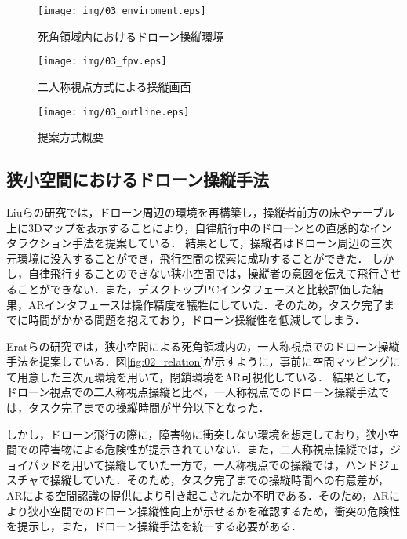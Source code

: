 \documentclass[submit]{ipsj}
\begin{document}
\begin{figure}[tb]
  \centering
  \texttt{[image: img/03\_enviroment.eps]}
  \caption{死角領域内におけるドローン操縦環境}
  \label{fig:03_enviroment}
  \end{figure}
  
  \begin{figure}[tb]
    \centering
    \texttt{[image: img/03\_fpv.eps]}
    \caption{二人称視点方式による操縦画面}
    \label{fig:03_FPV}
  \end{figure}
  
  \begin{figure}[tb]
  \centering
  \texttt{[image: img/03\_outline.eps]}
  \caption{提案方式概要}
  \label{fig:03_outline}
  \end{figure}

\subsection{狭小空間におけるドローン操縦手法}

Liuらの研究\cite{book-ar04}では，ドローン周辺の環境を再構築し，操縦者前方の床やテーブル上に3Dマップを表示することにより，自律航行中のドローンとの直感的なインタラクション手法を提案している．
結果として，操縦者はドローン周辺の三次元環境に没入することができ，飛行空間の探索に成功することができた．
しかし，自律飛行することのできない狭小空間では，操縦者の意図を伝えて飛行させることができない．また，デスクトップPCインタフェースと比較評価した結果，ARインタフェースは操作精度を犠牲にしていた．そのため，タスク完了までに時間がかかる問題を抱えており，ドローン操縦性を低減してしまう．

Eratらの研究\cite{article-ar05}では，狭小空間による死角領域内の，一人称視点でのドローン操縦手法を提案している．図\ref{fig:02_relation}が示すように，事前に空間マッピングにて用意した三次元環境を用いて，閉鎖環境をAR可視化している．
結果として，ドローン視点での二人称視点操縦と比べ，一人称視点でのドローン操縦手法では，タスク完了までの操縦時間が半分以下となった．

しかし，ドローン飛行の際に，障害物に衝突しない環境を想定しており，狭小空間での障害物による危険性が提示されていない．また，二人称視点操縦では，ジョイパッドを用いて操縦していた一方で，一人称視点での操縦では，ハンドジェスチャで操縦していた．そのため，タスク完了までの操縦時間への有意差が，ARによる空間認識の提供により引き起こされたか不明である．そのため，ARにより狭小空間でのドローン操縦性向上が示せるかを確認するため，衝突の危険性を提示し，また，ドローン操縦手法を統一する必要がある．
\end{document}
